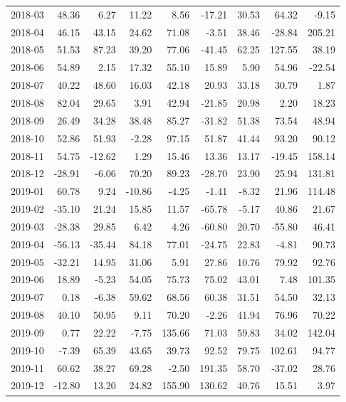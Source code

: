 \begin{table}[ht]
\begin{tabular}{lrrrrrrrr}
  2018-03 & 48.36 & 6.27 & 11.22 & 8.56 & -17.21 & 30.53 & 64.32 & -9.15 \\ 
  2018-04 & 46.15 & 43.15 & 24.62 & 71.08 & -3.51 & 38.46 & -28.84 & 205.21 \\ 
  2018-05 & 51.53 & 87.23 & 39.20 & 77.06 & -41.45 & 62.25 & 127.55 & 38.19 \\ 
  2018-06 & 54.89 & 2.15 & 17.32 & 55.10 & 15.89 & 5.90 & 54.96 & -22.54 \\ 
  2018-07 & 40.22 & 48.60 & 16.03 & 42.18 & 20.93 & 33.18 & 30.79 & 1.87 \\ 
  2018-08 & 82.04 & 29.65 & 3.91 & 42.94 & -21.85 & 20.98 & 2.20 & 18.23 \\ 
  2018-09 & 26.49 & 34.28 & 38.48 & 85.27 & -31.82 & 51.38 & 73.54 & 48.94 \\ 
  2018-10 & 52.86 & 51.93 & -2.28 & 97.15 & 51.87 & 41.44 & 93.20 & 90.12 \\ 
  2018-11 & 54.75 & -12.62 & 1.29 & 15.46 & 13.36 & 13.17 & -19.45 & 158.14 \\ 
  2018-12 & -28.91 & -6.06 & 70.20 & 89.23 & -28.70 & 23.90 & 25.94 & 131.81 \\ 
  2019-01 & 60.78 & 9.24 & -10.86 & -4.25 & -1.41 & -8.32 & 21.96 & 114.48 \\ 
  2019-02 & -35.10 & 21.24 & 15.85 & 11.57 & -65.78 & -5.17 & 40.86 & 21.67 \\ 
  2019-03 & -28.38 & 29.85 & 6.42 & 4.26 & -60.80 & 20.70 & -55.80 & 46.41 \\ 
  2019-04 & -56.13 & -35.44 & 84.18 & 77.01 & -24.75 & 22.83 & -4.81 & 90.73 \\ 
  2019-05 & -32.21 & 14.95 & 31.06 & 5.91 & 27.86 & 10.76 & 79.92 & 92.76 \\ 
  2019-06 & 18.89 & -5.23 & 54.05 & 75.73 & 75.02 & 43.01 & 7.48 & 101.35 \\ 
  2019-07 & 0.18 & -6.38 & 59.62 & 68.56 & 60.38 & 31.51 & 54.50 & 32.13 \\ 
  2019-08 & 40.10 & 50.95 & 9.11 & 70.20 & -2.26 & 41.94 & 76.96 & 70.22 \\ 
  2019-09 & 0.77 & 22.22 & -7.75 & 135.66 & 71.03 & 59.83 & 34.02 & 142.04 \\ 
  2019-10 & -7.39 & 65.39 & 43.65 & 39.73 & 92.52 & 79.75 & 102.61 & 94.77 \\ 
  2019-11 & 60.62 & 38.27 & 69.28 & -2.50 & 191.35 & 58.70 & -37.02 & 28.76 \\ 
  2019-12 & -12.80 & 13.20 & 24.82 & 155.90 & 130.62 & 40.76 & 15.51 & 3.97 \\ 

\end{tabular}
\end{table}
